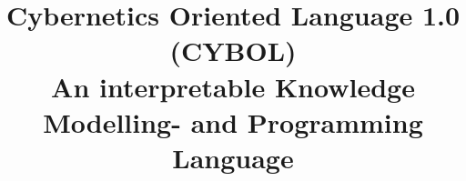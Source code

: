 %
%
%
%
%
%

%
%
%
%
\begin{titlepage}
    \title{
        Cybernetics Oriented Language 1.0\\
        (CYBOL)\\
        \vspace{1cm}
        \normalsize{\textmd{An interpretable Knowledge Modelling- and Programming Language\\}}
    }
    \author{
        \date{
        }
    }
\end{titlepage}
